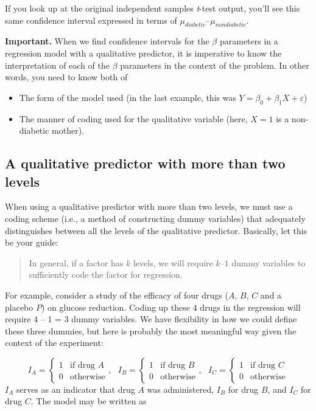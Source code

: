 \documentclass[
]{book}
\providecommand{\tightlist}{%
  \setlength{\itemsep}{0pt}\setlength{\parskip}{0pt}}
\begin{document}
If you look up at the original independent samples \emph{t}-test output, you'll see this same confidence interval expressed in terms of \(\mu_{diabetic} – \mu_{nondiabetic}\).

\textbf{Important.} When we find confidence intervals for the \(\beta\) parameters in a regression model with a qualitative predictor, it is imperative to know the interpretation of each of the \(\beta\) parameters in the context of the problem. In other words, you need to know both of

\begin{itemize}
\tightlist
\item
  The form of the model used (in the last example, this was \(Y = \beta_0 + \beta_1 X + \varepsilon\))
\item
  The manner of coding used for the qualitative variable (here, \(X=1\) is a non-diabetic mother).
\end{itemize}

\hypertarget{a-qualitative-predictor-with-more-than-two-levels}{%
\subsection{A qualitative predictor with more than two levels}\label{a-qualitative-predictor-with-more-than-two-levels}}

When using a qualitative predictor with more than two levels, we must use a coding scheme (i.e., a method of constructing dummy variables) that adequately distinguishes between all the levels of the qualitative predictor. Basically, let this be your guide:

\begin{quote}
In general, if a factor has \(k\) levels, we will require \(k – 1\) dummy variables to sufficiently code the factor for regression.
\end{quote}

For example, consider a study of the efficacy of four drugs (\(A\), \(B\), \(C\) and a placebo \(P\)) on glucose reduction. Coding up these 4 drugs in the regression will require 4 -- 1 = 3 dummy variables. We have flexibility in how we could define these three dummies, but here is probably the most meaningful way given the context of the experiment:

\[I_A = \left\{\begin{array}{ll} 1 & \textrm{if drug } A \\ 0 & \textrm{otherwise}\end{array}\right., ~~~ I_B = \left\{\begin{array}{ll} 1 & \textrm{if drug } B \\ 0 & \textrm{otherwise}\end{array}\right.,~~~ I_C = \left\{\begin{array}{ll} 1 & \textrm{if drug } C \\ 0 & \textrm{otherwise}\end{array}\right.\]
\(I_A\) serves as an indicator that drug \(A\) was administered, \(I_B\) for drug \(B\), and \(I_C\) for drug \(C\). The model may be written as
\end{document}

